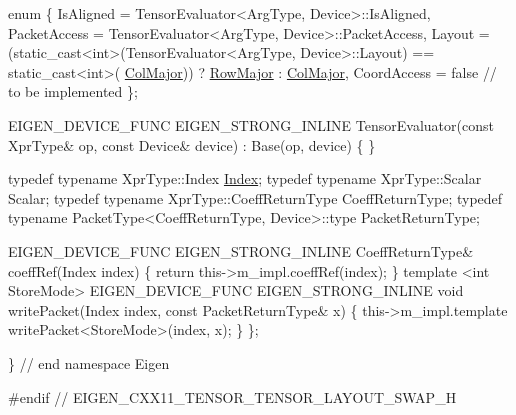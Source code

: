 \begin{DoxyCodeInclude}
  \textcolor{keyword}{enum} \{
    IsAligned = TensorEvaluator<ArgType, Device>::IsAligned,
    PacketAccess = TensorEvaluator<ArgType, Device>::PacketAccess,
    Layout = (\textcolor{keyword}{static\_cast<}\textcolor{keywordtype}{int}\textcolor{keyword}{>}(TensorEvaluator<ArgType, Device>::Layout) == static\_cast<int>(
      \hyperlink{group__enums_ggaacded1a18ae58b0f554751f6cdf9eb13a0cbd4bdd0abcfc0224c5fcb5e4f6669a}{ColMajor})) ? \hyperlink{group__enums_ggaacded1a18ae58b0f554751f6cdf9eb13acfcde9cd8677c5f7caf6bd603666aae3}{RowMajor} : \hyperlink{group__enums_ggaacded1a18ae58b0f554751f6cdf9eb13a0cbd4bdd0abcfc0224c5fcb5e4f6669a}{ColMajor},
    CoordAccess = \textcolor{keyword}{false}  \textcolor{comment}{// to be implemented}
  \};

  EIGEN\_DEVICE\_FUNC EIGEN\_STRONG\_INLINE TensorEvaluator(\textcolor{keyword}{const} XprType& op, \textcolor{keyword}{const} Device& device)
    : Base(op, device)
  \{ \}

  \textcolor{keyword}{typedef} \textcolor{keyword}{typename} XprType::Index \hyperlink{namespace_eigen_a62e77e0933482dafde8fe197d9a2cfde}{Index};
  \textcolor{keyword}{typedef} \textcolor{keyword}{typename} XprType::Scalar Scalar;
  \textcolor{keyword}{typedef} \textcolor{keyword}{typename} XprType::CoeffReturnType CoeffReturnType;
  \textcolor{keyword}{typedef} \textcolor{keyword}{typename} PacketType<CoeffReturnType, Device>::type PacketReturnType;

  EIGEN\_DEVICE\_FUNC EIGEN\_STRONG\_INLINE CoeffReturnType& coeffRef(Index index)
  \{
    \textcolor{keywordflow}{return} this->m\_impl.coeffRef(index);
  \}
  \textcolor{keyword}{template} <\textcolor{keywordtype}{int} StoreMode> EIGEN\_DEVICE\_FUNC EIGEN\_STRONG\_INLINE
  \textcolor{keywordtype}{void} writePacket(Index index, \textcolor{keyword}{const} PacketReturnType& x)
  \{
    this->m\_impl.template writePacket<StoreMode>(index, x);
  \}
\};

\} \textcolor{comment}{// end namespace Eigen}

\textcolor{preprocessor}{#endif // EIGEN\_CXX11\_TENSOR\_TENSOR\_LAYOUT\_SWAP\_H}
\end{DoxyCodeInclude}
 